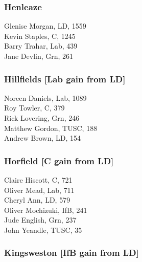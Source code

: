 \documentclass[a4paper,openany,10pt]{book}
\begin{document}
\subsubsection*{Henleaze}



Glenise Morgan, LD, 1559\\
Kevin Staples, C, 1245\\
Barry Trahar, Lab, 439\\
Jane Devlin, Grn, 261\\


\subsubsection*{Hillfields \hspace*{\fill}\nolinebreak[1]%
\enspace\hspace*{\fill}
[Lab gain from LD]}



Noreen Daniels, Lab, 1089\\
Roy Towler, C, 379\\
Rick Lovering, Grn, 246\\
Matthew Gordon, TUSC, 188\\
Andrew Brown, LD, 154\\


\subsubsection*{Horfield \hspace*{\fill}\nolinebreak[1]%
\enspace\hspace*{\fill}
[C gain from LD]}



Claire Hiscott, C, 721\\
Oliver Mead, Lab, 711\\
Cheryl Ann, LD, 579\\
Oliver Mochizuki, IfB, 241\\
Jude English, Grn, 237\\
John Yeandle, TUSC, 35\\


\subsubsection*{Kingsweston \hspace*{\fill}\nolinebreak[1]%
\enspace\hspace*{\fill}
[IfB gain from LD]}
\end{document}
